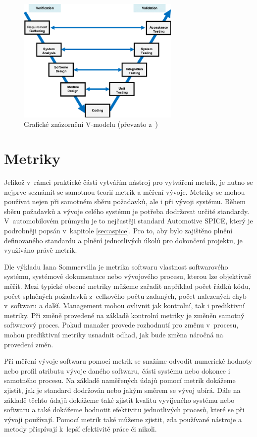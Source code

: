 \documentclass[czech,master]{diploma}
\begin{document}
 \begin{figure}[!ht]
    \centering
    \includegraphics[width=0.7\textwidth]{Diplomka/Figures/v-model-in-software-testing.png}
    \caption{Grafické znázornění V-modelu (převzato z~\cite{ref:vmodel_Tierno2016})}
    \label{fig:v_model}
\end{figure}


\chapter{Metriky}
\label{sec:metrics}
Jelikož v~rámci praktické části vytvářím nástroj pro vytváření metrik, je nutno se nejprve seznámit se samotnou teorií metrik a měření vývoje. Metriky se mohou používat nejen při samotném sběru požadavků, ale i při vývoji systému. Během sběru požadavků a vývoje celého systému je potřeba dodržovat určité standardy. V~automobilovém průmyslu je to nejčastěji standard Automotive SPICE, který je podrobněji popsán v~kapitole \ref{sec:aspice}. Pro to, aby bylo zajištěno plnění definovaného standardu a plnění jednotlivých úkolů pro dokončení projektu, je využíváno právě metrik.

Dle výkladu Iana Sommervilla \cite{ref:metric_definition} je metrika softwaru vlastnost softwarového systému, systémové dokumentace nebo vývojového procesu, kterou lze objektivně měřit. Mezi typické obecné metriky můžeme zařadit například počet řádků kódu, počet splněných požadavků z~celkového počtu zadaných, počet nalezených chyb v~softwaru a další. Management mohou ovlivnit jak kontrolní, tak i prediktivní metriky. Při změně provedené na základě kontrolní metriky je změněn samotný softwarový proces. Pokud manažer provede rozhodnutí pro změnu v~procesu, mohou prediktivní metriky usnadnit odhad, jak bude změna náročná na provedení změn.

Při měření vývoje softwaru pomocí metrik se snažíme odvodit numerické hodnoty nebo profil atributu vývoje daného softwaru, části systému nebo dokonce i samotného procesu. Na základě naměřených údajů pomocí metrik dokážeme zjistit, jak je standard dodržován nebo jakým směrem se vývoj ubírá. Dále na základě těchto údajů dokážeme také zjistit kvalitu vyvíjeného systému nebo softwaru a také dokážeme hodnotit efektivitu jednotlivých procesů, které se při vývoji používají. Pomocí metrik také můžeme zjistit, zda používané nástroje a metody přispívají k~lepší efektivitě práce či nikoli.
\end{document}
